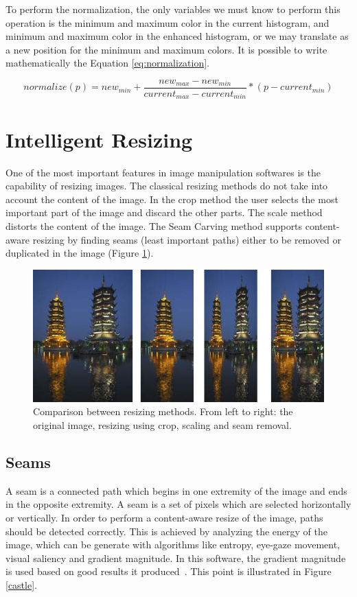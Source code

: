 \documentclass{article}
\begin{document}
		

		To perform the normalization, the only variables we must know to perform this operation is the minimum and maximum color in the current histogram, 
		and minimum and maximum color in the enhanced histogram, or we may translate as a new position for the minimum and maximum colors. It is possible
		to write mathematically the Equation \ref{eq:normalization}. \nocite{*}


		\begin{equation}
			normalize(p)=new_{min}+\frac{new_{max}-new_{min}}{current_{max}-current_{min}}*(p-current_{min})
			\label{eq:normalization}
		\end{equation}
		

\section{Intelligent Resizing}

	One of the most important features in image manipulation softwares is the capability of resizing images. The classical resizing methods do not take into account the content of the image. In the crop method the user selects the most important part of the image and discard the other parts. The scale method distorts the content of the image. The Seam Carving method supports content-aware resizing by finding seams (least important paths) either to be removed or duplicated in the image (Figure \ref{intelligent1}).

	\begin{figure} [H]
		\centering
		\includegraphics[scale=0.5]{images/intelligent3}
		\caption{Comparison between resizing methods. From left to right: the original image, resizing using crop, scaling and seam removal.\label{intelligent1}}
	\end{figure}

	\subsection{Seams}
	A seam is a connected path which begins in one extremity of the image and ends in the opposite extremity. A seam is a set of pixels which are selected horizontally or vertically. In order to perform a content-aware resize of the image, paths should be detected correctly. This is achieved by analyzing the energy of the image, which can be generate with algorithms like entropy, eye-gaze movement, visual saliency and gradient magnitude. In this software, the gradient magnitude is used based on good results it produced~\cite{ref:seamwiki}. This point is illustrated in Figure \ref{castle}.
\end{document}
